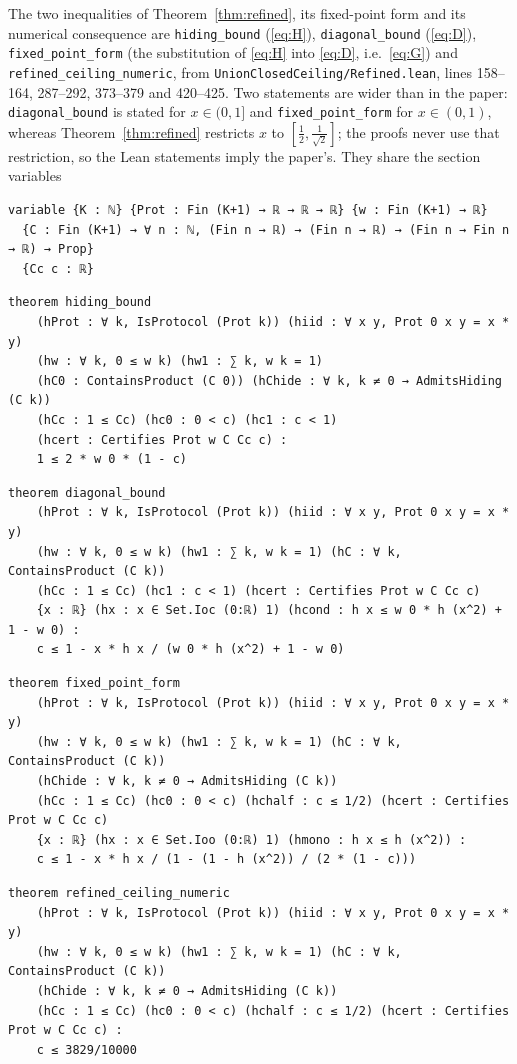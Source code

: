 \documentclass[11pt,a4paper]{article}
\theoremstyle{definition}
\theoremstyle{remark}
\begin{document}
The two inequalities of Theorem~\ref{thm:refined}, its fixed-point form and its numerical
consequence are \texttt{hiding\_bound} (\eqref{eq:H}), \texttt{diagonal\_bound}
(\eqref{eq:D}), \texttt{fixed\_point\_form} (the substitution of \eqref{eq:H} into
\eqref{eq:D}, i.e.\ \eqref{eq:G}) and \texttt{refined\_ceiling\_numeric}, from
\texttt{UnionClosedCeiling/\allowbreak Refined.lean}, lines 158--164, 287--292, 373--379 and 420--425. Two statements are wider than in the paper: \texttt{diagonal\_bound} is stated for $x\in(0,1]$ and \texttt{fixed\_point\_form} for $x\in(0,1)$, whereas Theorem~\ref{thm:refined} restricts $x$ to $[\tfrac12,\tfrac1{\sqrt2}]$; the proofs never use that restriction, so the Lean statements imply the paper's.
They share the section variables

\begin{Verbatim}[fontsize=\footnotesize,formatcom=\leanmono,samepage=false]
variable {K : ℕ} {Prot : Fin (K+1) → ℝ → ℝ → ℝ} {w : Fin (K+1) → ℝ}
  {C : Fin (K+1) → ∀ n : ℕ, (Fin n → ℝ) → (Fin n → ℝ) → (Fin n → Fin n → ℝ) → Prop}
  {Cc c : ℝ}
\end{Verbatim}

\begin{Verbatim}[fontsize=\footnotesize,formatcom=\leanmono,samepage=false]
theorem hiding_bound
    (hProt : ∀ k, IsProtocol (Prot k)) (hiid : ∀ x y, Prot 0 x y = x * y)
    (hw : ∀ k, 0 ≤ w k) (hw1 : ∑ k, w k = 1)
    (hC0 : ContainsProduct (C 0)) (hChide : ∀ k, k ≠ 0 → AdmitsHiding (C k))
    (hCc : 1 ≤ Cc) (hc0 : 0 < c) (hc1 : c < 1)
    (hcert : Certifies Prot w C Cc c) :
    1 ≤ 2 * w 0 * (1 - c)
\end{Verbatim}
\begin{Verbatim}[fontsize=\footnotesize,formatcom=\leanmono,samepage=false]
theorem diagonal_bound
    (hProt : ∀ k, IsProtocol (Prot k)) (hiid : ∀ x y, Prot 0 x y = x * y)
    (hw : ∀ k, 0 ≤ w k) (hw1 : ∑ k, w k = 1) (hC : ∀ k, ContainsProduct (C k))
    (hCc : 1 ≤ Cc) (hc1 : c < 1) (hcert : Certifies Prot w C Cc c)
    {x : ℝ} (hx : x ∈ Set.Ioc (0:ℝ) 1) (hcond : h x ≤ w 0 * h (x^2) + 1 - w 0) :
    c ≤ 1 - x * h x / (w 0 * h (x^2) + 1 - w 0)
\end{Verbatim}
\begin{Verbatim}[fontsize=\footnotesize,formatcom=\leanmono,samepage=false]
theorem fixed_point_form
    (hProt : ∀ k, IsProtocol (Prot k)) (hiid : ∀ x y, Prot 0 x y = x * y)
    (hw : ∀ k, 0 ≤ w k) (hw1 : ∑ k, w k = 1) (hC : ∀ k, ContainsProduct (C k))
    (hChide : ∀ k, k ≠ 0 → AdmitsHiding (C k))
    (hCc : 1 ≤ Cc) (hc0 : 0 < c) (hchalf : c ≤ 1/2) (hcert : Certifies Prot w C Cc c)
    {x : ℝ} (hx : x ∈ Set.Ioo (0:ℝ) 1) (hmono : h x ≤ h (x^2)) :
    c ≤ 1 - x * h x / (1 - (1 - h (x^2)) / (2 * (1 - c)))
\end{Verbatim}
\begin{Verbatim}[fontsize=\footnotesize,formatcom=\leanmono,samepage=false]
theorem refined_ceiling_numeric
    (hProt : ∀ k, IsProtocol (Prot k)) (hiid : ∀ x y, Prot 0 x y = x * y)
    (hw : ∀ k, 0 ≤ w k) (hw1 : ∑ k, w k = 1) (hC : ∀ k, ContainsProduct (C k))
    (hChide : ∀ k, k ≠ 0 → AdmitsHiding (C k))
    (hCc : 1 ≤ Cc) (hc0 : 0 < c) (hchalf : c ≤ 1/2) (hcert : Certifies Prot w C Cc c) :
    c ≤ 3829/10000
\end{Verbatim}
\end{document}
